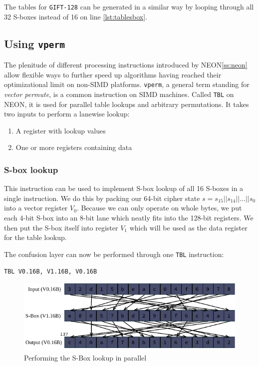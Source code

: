 The tables for \texttt{GIFT-128} can be generated in a similar way by looping
through all 32 S-boxes instead of 16 on line \ref{lst:tablesbox}.

\subsection{Using \texttt{vperm}}

The plenitude of different processing instructions introduced by
NEON\ref{ss:neon} allow flexible ways to further speed up algorithms having
reached their optimizational limit on non-SIMD platforms. \texttt{vperm}, a
general term standing for \textit{vector permute}, is a common instruction on
SIMD machines. Called \texttt{TBL} on NEON, it is used for parallel table
lookups and arbitrary permutations. It takes two inputs to perform a lanewise
lookup:

\begin{enumerate}
    \item A register with lookup values
    \item One or more registers containing data
\end{enumerate}

\subsubsection{S-box lookup}

This instruction can be used to implement S-box lookup of all 16 S-boxes in a
single instruction. We do this by packing our 64-bit cipher state
$s=s_{15}||s_{14}||\dots||s_0$ into a vector register $V_0$. Because we can
only operate on whole bytes, we put each 4-bit S-box into an 8-bit lane which
neatly fits into the 128-bit registers. We then put the S-box itself into
register $V_1$ which will be used as the data register for the table lookup.

The confusion layer can now be performed through one \texttt{TBL} instruction:

\begin{center}
    \texttt{TBL V0.16B, V1.16B, V0.16B}
\end{center}

\begin{figure}[h!]
    \centering
    \includegraphics[width=\textwidth]{Figures/tbl_example.pdf}
    \caption{Performing the S-Box lookup in parallel}
\end{figure}

